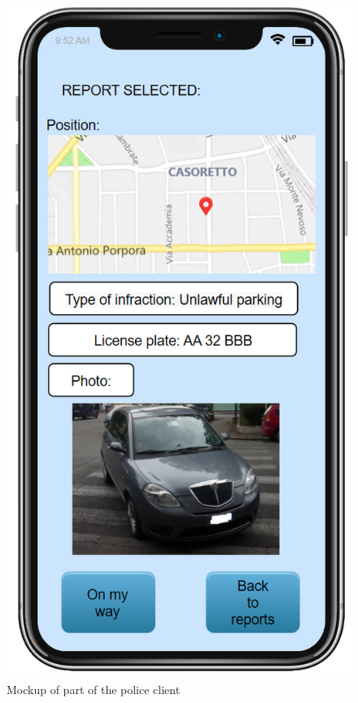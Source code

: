 	\begin{figure}[h!]
		\centering
		\includegraphics[scale=0.65]{Images/Policeman_client_mockup}
		\caption{Mockup of part of the police client}
	\end{figure}
    \newpage
